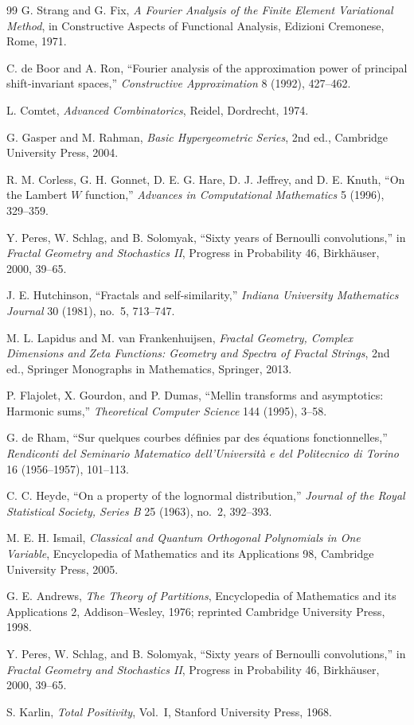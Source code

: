 \documentclass[11pt,oneside]{article}
\numberwithin{equation}{section}
\theoremstyle{definition}
\theoremstyle{remark}
\begin{document}
\begin{thebibliography}{99}
G. Strang and G. Fix,
\emph{A Fourier Analysis of the Finite Element Variational Method}, in
Constructive Aspects of Functional Analysis, Edizioni Cremonese, Rome, 1971.

C. de Boor and A. Ron,
``Fourier analysis of the approximation power of principal shift-invariant
spaces,'' \emph{Constructive Approximation} 8 (1992), 427--462.

L. Comtet,
\emph{Advanced Combinatorics}, Reidel, Dordrecht, 1974.

G. Gasper and M. Rahman,
\emph{Basic Hypergeometric Series}, 2nd ed., Cambridge University Press, 2004.

R. M. Corless, G. H. Gonnet, D. E. G. Hare, D. J. Jeffrey, and D. E. Knuth,
``On the Lambert $W$ function,'' \emph{Advances in Computational Mathematics}
5 (1996), 329--359.

Y. Peres, W. Schlag, and B. Solomyak,
``Sixty years of Bernoulli convolutions,'' in
\emph{Fractal Geometry and Stochastics II}, Progress in Probability 46,
Birkh\"auser, 2000, 39--65.

J. E. Hutchinson,
``Fractals and self-similarity,''
\emph{Indiana University Mathematics Journal} 30 (1981), no.~5, 713--747.

M. L. Lapidus and M. van Frankenhuijsen,
\emph{Fractal Geometry, Complex Dimensions and Zeta Functions:
Geometry and Spectra of Fractal Strings}, 2nd ed.,
Springer Monographs in Mathematics, Springer, 2013.

P. Flajolet, X. Gourdon, and P. Dumas,
``Mellin transforms and asymptotics: Harmonic sums,''
\emph{Theoretical Computer Science} 144 (1995), 3--58.

G. de Rham,
``Sur quelques courbes d\'efinies par des \'equations fonctionnelles,''
\emph{Rendiconti del Seminario Matematico dell'Universit\`a e del Politecnico
di Torino} 16 (1956--1957), 101--113.

C. C. Heyde,
``On a property of the lognormal distribution,''
\emph{Journal of the Royal Statistical Society, Series B} 25 (1963), no.~2,
392--393.

M. E. H. Ismail,
\emph{Classical and Quantum Orthogonal Polynomials in One Variable},
Encyclopedia of Mathematics and its Applications 98,
Cambridge University Press, 2005.

G. E. Andrews,
\emph{The Theory of Partitions},
Encyclopedia of Mathematics and its Applications 2,
Addison--Wesley, 1976; reprinted Cambridge University Press, 1998.

Y. Peres, W. Schlag, and B. Solomyak,
``Sixty years of Bernoulli convolutions,''
in \emph{Fractal Geometry and Stochastics II},
Progress in Probability 46, Birkh\"auser, 2000, 39--65.

S. Karlin,
\emph{Total Positivity}, Vol.~I,
Stanford University Press, 1968.

\end{thebibliography}
\end{document}
